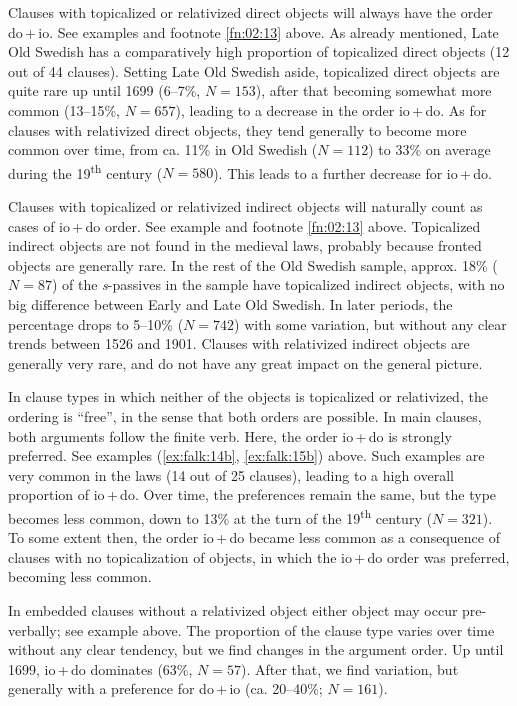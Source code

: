 \documentclass[output=paper]{langscibook}
\begin{document}
Clauses with topicalized or relativized direct objects will always have the order do\,+\,io. See examples  and footnote \ref{fn:02:13} above. As already mentioned, Late Old Swedish has a comparatively high proportion of topicalized direct objects (12 out of 44 clauses). Setting Late Old Swedish aside, topicalized direct objects are quite rare up until 1699 (6–7\%, $N = 153$), after that becoming somewhat more common (13–15\%, $N = 657$), leading to a decrease in the order io\,+\,do. As for clauses with relativized direct objects, they tend generally to become more common over time, from ca. 11\% in Old Swedish ($N = 112$) to 33\% on average during the 19\textsuperscript{th} century ($N = 580$). This leads to a further decrease for io\,+\,do.


 Clauses with topicalized or relativized indirect objects will naturally count as cases of io\,+\,do order. See example  and footnote \ref{fn:02:13} above. Topicalized indirect objects are not found in the medieval laws, probably because fronted objects are generally rare. In the rest of the Old Swedish sample, approx. 18\% ($N = 87$) of the \textit{s}{}-passives in the sample have topicalized indirect objects, with no big difference between Early and Late Old Swedish. In later periods, the percentage drops to 5–10\% ($N = 742$) with some variation, but without any clear trends between 1526 and 1901. Clauses with relativized indirect objects are generally very rare, and do not have any great impact on the general picture.



In clause types in which neither of the objects is topicalized or relativized, the ordering is “free”, in the sense that both orders are possible. In main clauses, both arguments follow the finite verb. Here, the order io\,+\,do is strongly preferred. See examples (\ref{ex:falk:14b}, \ref{ex:falk:15b}) above. Such examples are very common in the laws (14 out of 25 clauses), leading to a high overall proportion of io\,+\,do. Over time, the preferences remain the same, but the type becomes less common, down to 13\% at the turn of the 19\textsuperscript{th} century ($N = 321$). To some extent then, the order io\,+\,do became less common as a consequence of clauses with no topicalization of objects, in which the io\,+\,do order was preferred, becoming less common.



In embedded clauses without a relativized object either object may occur pre-verbally; see example  above. The proportion of the clause type varies over time without any clear tendency, but we find changes in the argument order. Up until 1699, io\,+\,do dominates (63\%, $N = 57$). After that, we find variation, but generally with a preference for do\,+\,io (ca. 20–40\%; $N = 161$).
\end{document}
